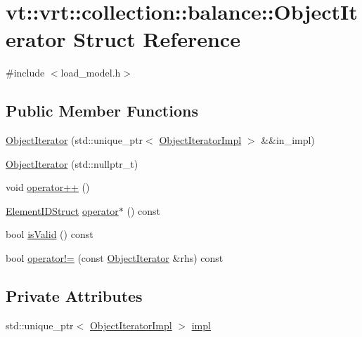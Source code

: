 \hypertarget{structvt_1_1vrt_1_1collection_1_1balance_1_1_object_iterator}{}\section{vt\+:\+:vrt\+:\+:collection\+:\+:balance\+:\+:Object\+Iterator Struct Reference}
\label{structvt_1_1vrt_1_1collection_1_1balance_1_1_object_iterator}


{\ttfamily \#include $<$load\+\_\+model.\+h$>$}

\subsection*{Public Member Functions}
\begin{DoxyCompactItemize}
\item 
\hyperlink{structvt_1_1vrt_1_1collection_1_1balance_1_1_object_iterator_a059d6516aa6a1e01a7580d51d551db91}{Object\+Iterator} (std\+::unique\+\_\+ptr$<$ \hyperlink{structvt_1_1vrt_1_1collection_1_1balance_1_1_object_iterator_impl}{Object\+Iterator\+Impl} $>$ \&\&in\+\_\+impl)
\item 
\hyperlink{structvt_1_1vrt_1_1collection_1_1balance_1_1_object_iterator_ae04e995ab1ae05140c98db4280c3b93d}{Object\+Iterator} (std\+::nullptr\+\_\+t)
\item 
void \hyperlink{structvt_1_1vrt_1_1collection_1_1balance_1_1_object_iterator_a22189471c74df1c8c1a29edf6f659244}{operator++} ()
\item 
\hyperlink{structvt_1_1vrt_1_1collection_1_1balance_1_1_element_i_d_struct}{Element\+I\+D\+Struct} \hyperlink{structvt_1_1vrt_1_1collection_1_1balance_1_1_object_iterator_a501c99951426eeaa29971c50118c30d0}{operator$\ast$} () const
\item 
bool \hyperlink{structvt_1_1vrt_1_1collection_1_1balance_1_1_object_iterator_af4dba6c74f33c10c7a16b24d0ec7e5bf}{is\+Valid} () const
\item 
bool \hyperlink{structvt_1_1vrt_1_1collection_1_1balance_1_1_object_iterator_a9ab504d3cb9a769928f21dfe804844fb}{operator!=} (const \hyperlink{structvt_1_1vrt_1_1collection_1_1balance_1_1_object_iterator}{Object\+Iterator} \&rhs) const
\end{DoxyCompactItemize}
\subsection*{Private Attributes}
\begin{DoxyCompactItemize}
\item 
std\+::unique\+\_\+ptr$<$ \hyperlink{structvt_1_1vrt_1_1collection_1_1balance_1_1_object_iterator_impl}{Object\+Iterator\+Impl} $>$ \hyperlink{structvt_1_1vrt_1_1collection_1_1balance_1_1_object_iterator_abe8e8b725eca54696504c22edba21922}{impl}
\end{DoxyCompactItemize}


